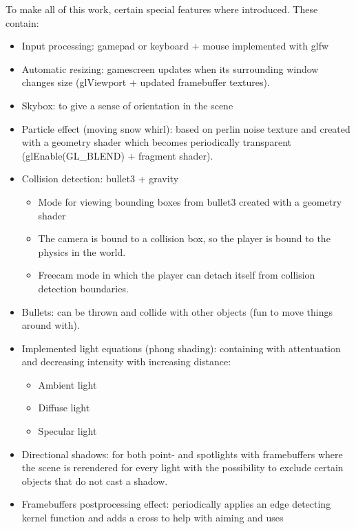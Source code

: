 \documentclass[]{article}
\begin{document}
To make all of this work, certain special features where introduced. These
contain:
\begin{itemize}
    \item Input processing: gamepad or keyboard + mouse implemented with glfw
    \item Automatic resizing: gamescreen updates when its surrounding window
          changes size (glViewport + updated framebuffer textures).
    \item Skybox: to give a sense of orientation in the scene
    \item Particle effect (moving snow whirl): based on perlin noise texture and
          created with a geometry shader which becomes periodically transparent
          (glEnable(GL\_BLEND) + fragment shader).
    \item Collision detection: bullet3 + gravity
          \begin{itemize}
              \item Mode for viewing bounding boxes from bullet3 created with a
                    geometry shader
              \item The camera is bound to a collision box, so the player is
                    bound to the physics in the world.
              \item Freecam mode in which the player can detach itself from
                    collision detection boundaries.
          \end{itemize}
    \item Bullets: can be thrown and collide with other objects (fun to move
          things around with).
    \item Implemented light equations (phong shading): containing with
          attentuation and decreasing intensity with increasing distance:
          \begin{itemize}
              \item Ambient light
              \item Diffuse light
              \item Specular light
          \end{itemize}
    \item Directional shadows: for both point- and spotlights with
          framebuffers where the scene is rerendered for every light with the
          possibility to exclude certain objects that do not cast a shadow.
    \item Framebuffers postprocessing effect: periodically applies an edge
          detecting kernel function and adds a cross to help with aiming and uses

\end{itemize}
\end{document}
